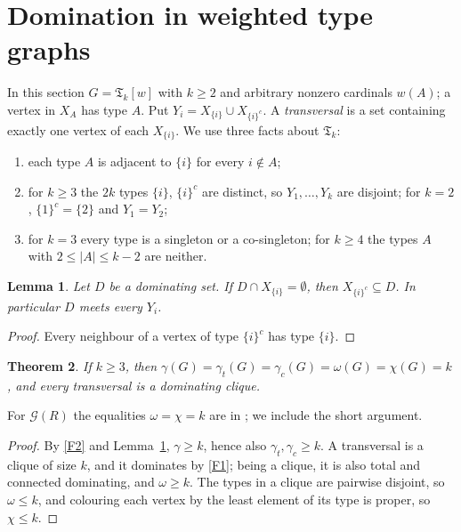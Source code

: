 \documentclass[11pt]{amsart}
\newtheorem{theorem}{Theorem}[section]
\newtheorem{lemma}[theorem]{Lemma}
\theoremstyle{definition}
\theoremstyle{remark}
\newcommand{\G}{\mathcal{G}}
\newcommand{\TG}{\mathfrak{T}}
\newcommand{\co}[1]{{#1}^{c}}
\begin{document}
\section{Domination in weighted type graphs}\label{sec:domination}

In this section $G=\TG_k[w]$ with $k\ge2$ and arbitrary nonzero cardinals $w(A)$; a vertex in $X_A$
has type $A$. Put $Y_i=X_{\{i\}}\cup X_{\co{\{i\}}}$. A \emph{transversal} is a set containing exactly
one vertex of each $X_{\{i\}}$. We use three facts about $\TG_k$:
\begin{enumerate}[label=(F\arabic*)]
\item\label{F1} each type $A$ is adjacent to $\{i\}$ for every $i\notin A$;
\item\label{F2} for $k\ge3$ the $2k$ types $\{i\}$, $\co{\{i\}}$ are distinct, so $Y_1,\dots,Y_k$ are
  disjoint; for $k=2$, $\co{\{1\}}=\{2\}$ and $Y_1=Y_2$;
\item\label{F3} for $k=3$ every type is a singleton or a co-singleton; for $k\ge4$ the types $A$
  with $2\le|A|\le k-2$ are neither.
\end{enumerate}

\begin{lemma}\label{lem:key}
Let $D$ be a dominating set. If $D\cap X_{\{i\}}=\emptyset$, then $X_{\co{\{i\}}}\subseteq D$. In
particular $D$ meets every $Y_i$.
\end{lemma}

\begin{proof}
Every neighbour of a vertex of type $\co{\{i\}}$ has type $\{i\}$.
\end{proof}

\begin{theorem}\label{thm:gamma-k3}
If $k\ge3$, then $\gamma(G)=\gamma_t(G)=\gamma_c(G)=\omega(G)=\chi(G)=k$, and every transversal is a
dominating clique.
\end{theorem}

For $\G(R)$ the equalities $\omega=\chi=k$ are in \cite{MP11}; we include the short argument.

\begin{proof}
By \ref{F2} and Lemma~\ref{lem:key}, $\gamma\ge k$, hence also $\gamma_t,\gamma_c\ge k$. A transversal is a clique of size $k$, and it
dominates by \ref{F1}; being a clique, it is also total and connected dominating, and $\omega\ge k$. The types in a
clique are pairwise disjoint, so $\omega\le k$, and colouring each vertex by the least element of
its type is proper, so $\chi\le k$.
\end{proof}
\end{document}
